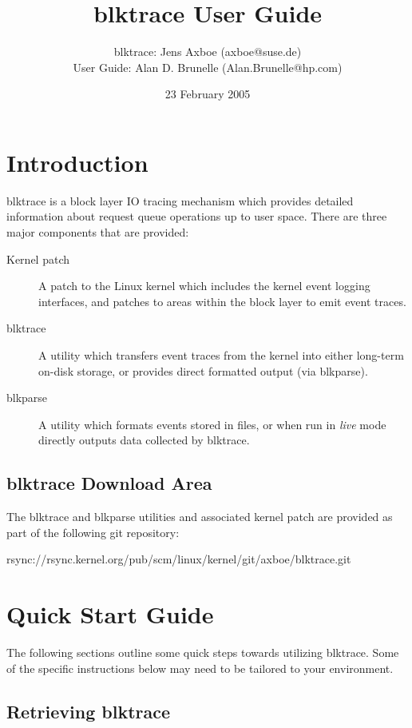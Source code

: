 \documentclass{article}
\title{blktrace User Guide}
\author{blktrace: Jens Axboe (axboe@suse.de)\\
        User Guide: Alan D. Brunelle (Alan.Brunelle@hp.com)}
\date{23 February 2005}
\begin{document}
\maketitle
\section{\label{sec:intro}Introduction}

blktrace is a block layer IO tracing mechanism which provides detailed
information about request queue operations up to user space. There are
three major components that are provided:

\begin{description}
  \item[Kernel patch] A patch to the Linux kernel which includes the
  kernel event logging interfaces, and patches to areas within the block
  layer to emit event traces.

  \item[blktrace] A utility which transfers event traces from the kernel
  into either long-term on-disk storage, or provides direct formatted
  output (via blkparse).

  \item[blkparse] A utility which formats events stored in files, or when
  run in \emph{live} mode directly outputs data collected by blktrace.
\end{description}

\subsection{blktrace Download Area}

The blktrace and blkparse utilities and associated kernel patch are provided
as part of the following git repository:

rsync://rsync.kernel.org/pub/scm/linux/kernel/git/axboe/blktrace.git

\newpage\section{\label{sec:quick-start}Quick Start Guide}

The following sections outline some quick steps towards utilizing
blktrace. Some of the specific instructions below may need to be tailored
to your environment.

\subsection{\label{sec:get-blktrace}Retrieving blktrace}
\end{document}
